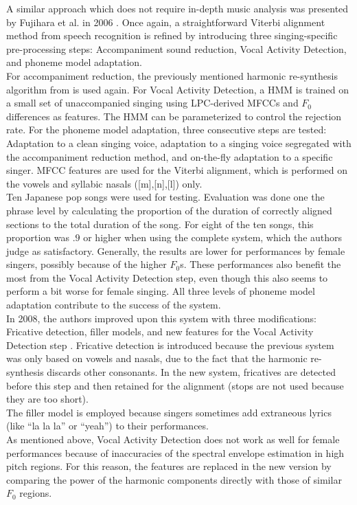 A similar approach which does not require in-depth music analysis was presented by Fujihara et al. in 2006 \cite{fujihara_alignment}. Once again, a straightforward Viterbi alignment method from speech recognition is refined by introducing three singing-specific pre-processing steps: Accompaniment sound reduction, Vocal Activity Detection, and phoneme model adaptation.\\
For accompaniment reduction, the previously mentioned harmonic re-synthesis algorithm from \cite{fujihara_identification} is used again. For Vocal Activity Detection, a HMM is trained on a small set of unaccompanied singing using LPC-derived MFCCs and $F_0$ differences as features. The HMM can be parameterized to control the rejection rate. For the phoneme model adaptation, three consecutive steps are tested: Adaptation to a clean singing voice, adaptation to a singing voice segregated with the accompaniment reduction method, and on-the-fly adaptation to a specific singer. MFCC features are used for the Viterbi alignment, which is performed on the vowels and syllabic nasals ([m],[n],[l]) only.\\
Ten Japanese pop songs were used for testing. Evaluation was done one the phrase level by calculating the proportion of the duration of correctly aligned sections to the total duration of the song. For eight of the ten songs, this proportion was $.9$ or higher when using the complete system, which the authors judge as satisfactory. Generally, the results are lower for performances by female singers, possibly because of the higher $F_0$s. These performances also benefit the most from the Vocal Activity Detection step, even though this also seems to perform a bit worse for female singing. All three levels of phoneme model adaptation contribute to the success of the system.\\
In 2008, the authors improved upon this system with three modifications: Fricative detection, filler models, and new features for the Vocal Activity Detection step \cite{fujihara}. Fricative detection is introduced because the previous system was only based on vowels and nasals, due to the fact that the harmonic re-synthesis discards other consonants. In the new system, fricatives are detected before this step and then retained for the alignment (stops are not used because they are too short).\\
The filler model is employed because singers sometimes add extraneous lyrics (like ``la la la'' or ``yeah'') to their performances.\\
As mentioned above, Vocal Activity Detection does not work as well for female performances because of inaccuracies of the spectral envelope estimation in high pitch regions. For this reason, the features are replaced in the new version by comparing the power of the harmonic components directly with those of similar $F_0$ regions.\\
